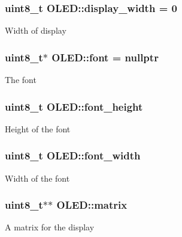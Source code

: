 \subsubsection[{\texorpdfstring{display\+\_\+width}{display_width}}]{\setlength{\rightskip}{0pt plus 5cm}uint8\+\_\+t O\+L\+E\+D\+::display\+\_\+width = 0\hspace{0.3cm}{\ttfamily [private]}}\hypertarget{class_o_l_e_d_a2e9305cb3341509bb62d61f33cae76fd}{}\label{class_o_l_e_d_a2e9305cb3341509bb62d61f33cae76fd}
Width of display 
\subsubsection[{\texorpdfstring{font}{font}}]{\setlength{\rightskip}{0pt plus 5cm}uint8\+\_\+t$\ast$ O\+L\+E\+D\+::font = nullptr\hspace{0.3cm}{\ttfamily [private]}}\hypertarget{class_o_l_e_d_a29ab86a4a73f4d343bf1810927f0911d}{}\label{class_o_l_e_d_a29ab86a4a73f4d343bf1810927f0911d}
The font 
\subsubsection[{\texorpdfstring{font\+\_\+height}{font_height}}]{\setlength{\rightskip}{0pt plus 5cm}uint8\+\_\+t O\+L\+E\+D\+::font\+\_\+height\hspace{0.3cm}{\ttfamily [private]}}\hypertarget{class_o_l_e_d_a85b91421932866dea031921799ba83a3}{}\label{class_o_l_e_d_a85b91421932866dea031921799ba83a3}
Height of the font 
\subsubsection[{\texorpdfstring{font\+\_\+width}{font_width}}]{\setlength{\rightskip}{0pt plus 5cm}uint8\+\_\+t O\+L\+E\+D\+::font\+\_\+width\hspace{0.3cm}{\ttfamily [private]}}\hypertarget{class_o_l_e_d_a3c9ea103adf6c860a2534135e9a25ba8}{}\label{class_o_l_e_d_a3c9ea103adf6c860a2534135e9a25ba8}
Width of the font 
\subsubsection[{\texorpdfstring{matrix}{matrix}}]{\setlength{\rightskip}{0pt plus 5cm}uint8\+\_\+t$\ast$$\ast$ O\+L\+E\+D\+::matrix\hspace{0.3cm}{\ttfamily [private]}}\hypertarget{class_o_l_e_d_a9d32e21189940afba24deab0a2bc0126}{}\label{class_o_l_e_d_a9d32e21189940afba24deab0a2bc0126}
A matrix for the display 
